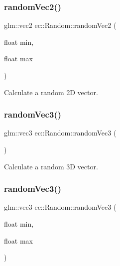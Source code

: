 \subsubsection{\texorpdfstring{random\+Vec2()}{randomVec2()}\hspace{0.1cm}{\footnotesize\ttfamily [2/2]}}
{\footnotesize\ttfamily glm\+::vec2 ec\+::\+Random\+::random\+Vec2 (\begin{DoxyParamCaption}\item[{float}]{min,  }\item[{float}]{max }\end{DoxyParamCaption})\hspace{0.3cm}{\ttfamily [static]}}

Calculate a random 2D vector. \mbox{\label{classec_1_1_random_a4242b9cac76d3e88bde39826ddbd6e3c}} 
\subsubsection{\texorpdfstring{random\+Vec3()}{randomVec3()}\hspace{0.1cm}{\footnotesize\ttfamily [1/2]}}
{\footnotesize\ttfamily glm\+::vec3 ec\+::\+Random\+::random\+Vec3 (\begin{DoxyParamCaption}{ }\end{DoxyParamCaption})\hspace{0.3cm}{\ttfamily [static]}}

Calculate a random 3D vector. \mbox{\label{classec_1_1_random_a84ec2078788971de906b5f2f17a61d55}} 
\subsubsection{\texorpdfstring{random\+Vec3()}{randomVec3()}\hspace{0.1cm}{\footnotesize\ttfamily [2/2]}}
{\footnotesize\ttfamily glm\+::vec3 ec\+::\+Random\+::random\+Vec3 (\begin{DoxyParamCaption}\item[{float}]{min,  }\item[{float}]{max }\end{DoxyParamCaption})\hspace{0.3cm}{\ttfamily [static]}}

